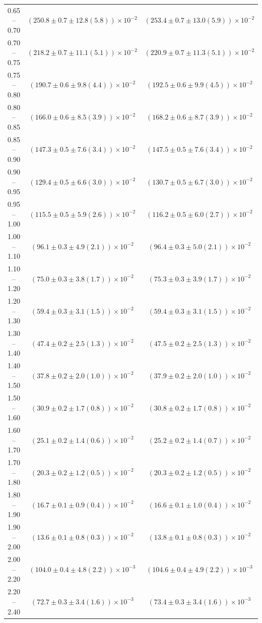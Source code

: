 \begin{table}
\begin{center}
\begin{tabular}{ c | c c }
0.65 -- 0.70 & $(250.8\pm0.7\pm12.8(5.8))\times10^{-2}$ & $(253.4\pm0.7\pm13.0(5.9))\times10^{-2}$ \\ 
0.70 -- 0.75 & $(218.2\pm0.7\pm11.1(5.1))\times10^{-2}$ & $(220.9\pm0.7\pm11.3(5.1))\times10^{-2}$ \\ 
0.75 -- 0.80 & $(190.7\pm0.6\pm9.8(4.4))\times10^{-2}$ & $(192.5\pm0.6\pm9.9(4.5))\times10^{-2}$ \\ 
0.80 -- 0.85 & $(166.0\pm0.6\pm8.5(3.9))\times10^{-2}$ & $(168.2\pm0.6\pm8.7(3.9))\times10^{-2}$ \\ 
0.85 -- 0.90 & $(147.3\pm0.5\pm7.6(3.4))\times10^{-2}$ & $(147.5\pm0.5\pm7.6(3.4))\times10^{-2}$ \\ 
0.90 -- 0.95 & $(129.4\pm0.5\pm6.6(3.0))\times10^{-2}$ & $(130.7\pm0.5\pm6.7(3.0))\times10^{-2}$ \\ 
0.95 -- 1.00 & $(115.5\pm0.5\pm5.9(2.6))\times10^{-2}$ & $(116.2\pm0.5\pm6.0(2.7))\times10^{-2}$ \\ 
1.00 -- 1.10 & $(96.1\pm0.3\pm4.9(2.1))\times10^{-2}$ & $(96.4\pm0.3\pm5.0(2.1))\times10^{-2}$ \\ 
1.10 -- 1.20 & $(75.0\pm0.3\pm3.8(1.7))\times10^{-2}$ & $(75.3\pm0.3\pm3.9(1.7))\times10^{-2}$ \\ 
1.20 -- 1.30 & $(59.4\pm0.3\pm3.1(1.5))\times10^{-2}$ & $(59.4\pm0.3\pm3.1(1.5))\times10^{-2}$ \\ 
1.30 -- 1.40 & $(47.4\pm0.2\pm2.5(1.3))\times10^{-2}$ & $(47.5\pm0.2\pm2.5(1.3))\times10^{-2}$ \\ 
1.40 -- 1.50 & $(37.8\pm0.2\pm2.0(1.0))\times10^{-2}$ & $(37.9\pm0.2\pm2.0(1.0))\times10^{-2}$ \\ 
1.50 -- 1.60 & $(30.9\pm0.2\pm1.7(0.8))\times10^{-2}$ & $(30.8\pm0.2\pm1.7(0.8))\times10^{-2}$ \\ 
1.60 -- 1.70 & $(25.1\pm0.2\pm1.4(0.6))\times10^{-2}$ & $(25.2\pm0.2\pm1.4(0.7))\times10^{-2}$ \\ 
1.70 -- 1.80 & $(20.3\pm0.2\pm1.2(0.5))\times10^{-2}$ & $(20.3\pm0.2\pm1.2(0.5))\times10^{-2}$ \\ 
1.80 -- 1.90 & $(16.7\pm0.1\pm0.9(0.4))\times10^{-2}$ & $(16.6\pm0.1\pm1.0(0.4))\times10^{-2}$ \\ 
1.90 -- 2.00 & $(13.6\pm0.1\pm0.8(0.3))\times10^{-2}$ & $(13.8\pm0.1\pm0.8(0.3))\times10^{-2}$ \\ 
2.00 -- 2.20 & $(104.0\pm0.4\pm4.8(2.2))\times10^{-3}$ & $(104.6\pm0.4\pm4.9(2.2))\times10^{-3}$ \\ 
2.20 -- 2.40 & $(72.7\pm0.3\pm3.4(1.6))\times10^{-3}$ & $(73.4\pm0.3\pm3.4(1.6))\times10^{-3}$ \\ 

\end{tabular}
\end{center}
\end{table}
